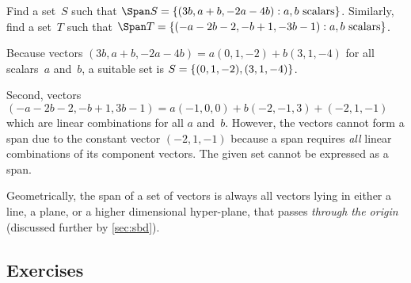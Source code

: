 \begin{example} \label{eg:}
Find a set~\(S\) such that \(\Span S=\{(3b,a+b,-2a-4b): a,b\text{ scalars}\}\).
Similarly, find a set~\(T\) such that \(\Span T=\{(-a-2b-2,-b+1, -3b-1): a,b\text{ scalars}\}\).
\begin{solution} 
Because vectors \((3b,a+b,-2a-4b)=a(0,1,-2)+b(3,1,-4)\) for all scalars~\(a\) and~\(b\),  a suitable set is \(S=\{(0,1,-2),\linebreak[1] (3,1,-4)\}\). 

Second, vectors \((-a-2b-2,-b+1, 3b-1)=a(-1,0,0)+b(-2,-1,3)+(-2,1,-1)\) which are linear combinations for all \(a\) and~\(b\). 
However, the vectors cannot form a span due to the constant vector \((-2,1,-1)\) because a span requires \emph{all} linear combinations of its component vectors.
The given set cannot be expressed as a span. 
\end{solution}
\end{example}





Geometrically, the span of a set of vectors is always all vectors lying in either a line, a plane, or  a higher dimensional hyper-plane, that passes \emph{through the origin} (discussed further by \autoref{sec:sbd}).


\begin{comment}
Do not introduce ``Linear Independence'' yet as orthogonality is more important in applications---leave it until \autoref{ch:gee}.  
Instead soon introduce the more commonly invoked concept of orthonormal vectors.
\end{comment}




%
%



\subsection{Exercises}



